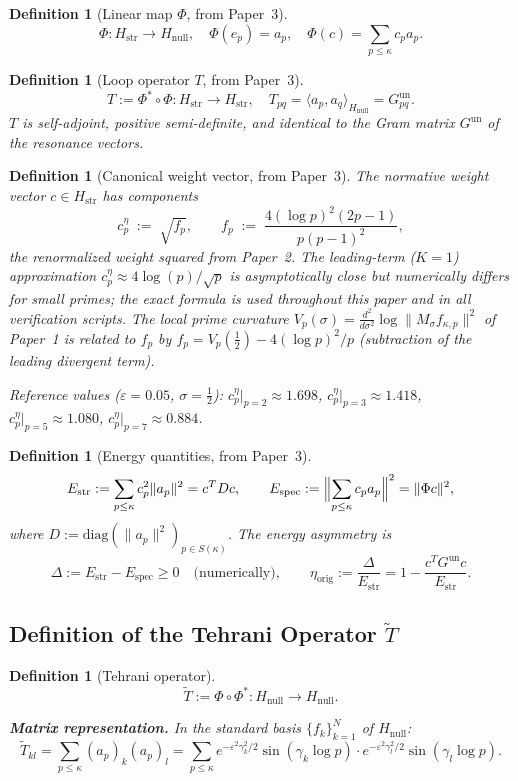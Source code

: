 \documentclass[11pt]{article}
\newtheorem{definition}[theorem]{Definition}
\newcommand{\Hstr}{H_{\mathrm{str}}}
\newcommand{\Hnull}{H_{\mathrm{null}}}
\newcommand{\Estr}{E_{\mathrm{str}}}
\newcommand{\Espec}{E_{\mathrm{spec}}}
\newcommand{\etaorig}{\eta_{\mathrm{orig}}}
\newcommand{\Gun}{G^{\mathrm{un}}}
\newcommand{\Tt}{\widetilde{T}}
\newcommand{\ceta}{c_p^{\eta}}
\newcommand{\fp}{f_p}
\begin{document}
\begin{definition}[Linear map $\Phi$, from Paper~3]
\[
\Phi\colon\Hstr\to\Hnull,\quad
\Phi(e_p) = a_p,\quad
\Phi(c) = \sum_{p\leq\kappa}c_p a_p.
\]
\end{definition}

\begin{definition}[Loop operator $T$, from Paper~3]
\[
T := \Phi^*\circ\Phi\colon\Hstr\to\Hstr,\quad
T_{pq} = \langle a_p,a_q\rangle_{\Hnull} = G^{\mathrm{un}}_{pq}.
\]
$T$ is self-adjoint, positive semi-definite, and identical to the Gram
matrix $\Gun$ of the resonance vectors.
\end{definition}

\begin{definition}[Canonical weight vector, from Paper~3]
The normative weight vector $c\in\Hstr$ has components
\[
  \ceta \;:=\; \sqrt{\fp}, \qquad
  \fp \;:=\; \frac{4(\log p)^2(2p-1)}{p(p-1)^2},
\]
the renormalized weight squared from Paper~2.
The leading-term ($K=1$) approximation $\ceta \approx 4\log(p)/\sqrt{p}$
is asymptotically close but numerically differs for small primes;
the exact formula is used throughout this paper and in all verification scripts.
The local prime curvature $V_p(\sigma) = \tfrac{d^2}{d\sigma^2}\log\|M_\sigma f_{\kappa,p}\|^2$
of Paper~1 is related to $\fp$ by $\fp = V_p(\tfrac12) - 4(\log p)^2/p$
(subtraction of the leading divergent term).

Reference values ($\varepsilon=0.05$, $\sigma=\tfrac{1}{2}$):
$\ceta|_{p=2}\approx 1.698$, $\ceta|_{p=3}\approx 1.418$,
$\ceta|_{p=5}\approx 1.080$, $\ceta|_{p=7}\approx 0.884$.
\end{definition}

\begin{definition}[Energy quantities, from Paper~3]
\[
\Estr := \sum_{p\leq\kappa}c_p^2\|a_p\|^2 = c^T Dc,
\qquad
\Espec := \Bigl\|\sum_{p\leq\kappa}c_p a_p\Bigr\|^2 = \|\Phi c\|^2,
\]
where $D := \mathrm{diag}(\|a_p\|^2)_{p\in S(\kappa)}$.
The energy asymmetry is
\[
\Delta := \Estr - \Espec \geq 0\quad\text{(numerically)},
\qquad
\etaorig := \frac{\Delta}{\Estr}
= 1 - \frac{c^T\Gun c}{\Estr}.
\]
\end{definition}

\subsection{Definition of the Tehrani Operator $\widetilde{T}$}

\begin{definition}[Tehrani operator]\label{def:Tt}
\[
\Tt := \Phi\circ\Phi^*\colon\Hnull\to\Hnull.
\]

\textbf{Matrix representation.}
In the standard basis $\{f_k\}_{k=1}^N$ of $\Hnull$:
\[
\Tt_{kl}
= \sum_{p\leq\kappa}(a_p)_k(a_p)_l
= \sum_{p\leq\kappa}
e^{-\varepsilon^2\gamma_k^2/2}\sin(\gamma_k\log p)
\cdot
e^{-\varepsilon^2\gamma_l^2/2}\sin(\gamma_l\log p).
\]
\end{definition}
\end{document}
